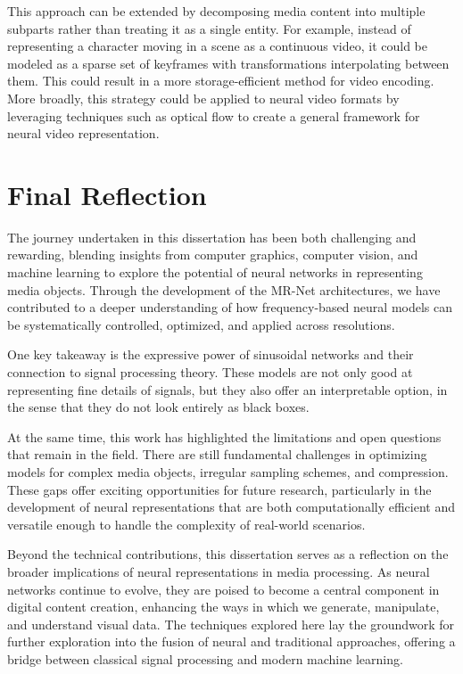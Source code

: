 This approach can be extended by decomposing media content into multiple subparts rather than treating it as a single entity. For example, instead of representing a character moving in a scene as a continuous video, it could be modeled as a sparse set of keyframes with transformations interpolating between them. This could result in a more storage-efficient method for video encoding. More broadly, this strategy could be applied to neural video formats by leveraging techniques such as optical flow \citep{alfarano-opticalflow} to create a general framework for neural video representation.


\section{Final Reflection}

The journey undertaken in this dissertation has been both challenging and rewarding, blending insights from computer graphics, computer vision, and machine learning to explore the potential of neural networks in representing media objects. Through the development of the MR-Net architectures, we have contributed to a deeper understanding of how frequency-based neural models can be systematically controlled, optimized, and applied across resolutions.

One key takeaway is the expressive power of sinusoidal networks and their connection to signal processing theory. These models are not only good at representing fine details of signals, but they also offer an interpretable option, in the sense that they do not look entirely as black boxes.

At the same time, this work has highlighted the limitations and open questions that remain in the field. There are still fundamental challenges in optimizing models for complex media objects, irregular sampling schemes, and compression. These gaps offer exciting opportunities for future research, particularly in the development of neural representations that are both computationally efficient and versatile enough to handle the complexity of real-world scenarios.

Beyond the technical contributions, this dissertation serves as a reflection on the broader implications of neural representations in media processing. As neural networks continue to evolve, they are poised to become a central component in digital content creation, enhancing the ways in which we generate, manipulate, and understand visual data. The techniques explored here lay the groundwork for further exploration into the fusion of neural and traditional approaches, offering a bridge between classical signal processing and modern machine learning.

